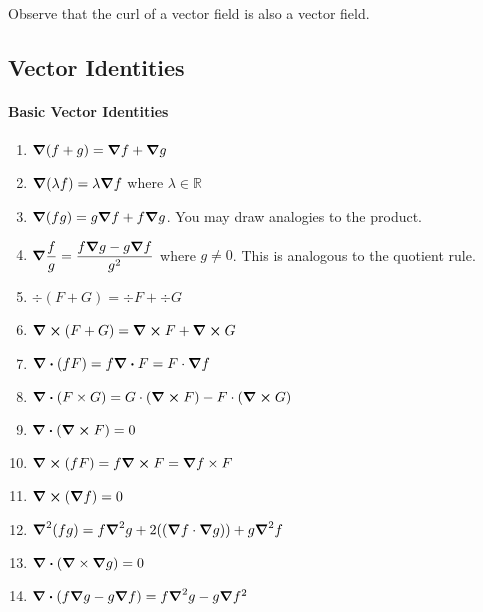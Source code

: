 Observe that the curl of a vector field is also a vector field.

\subsection{Vector Identities}


\paragraph{Basic Vector Identities}

\begin{enumerate}
    \item \(\grad(f + g) = \grad f + \grad g\)
    \item \(\grad (\lambda f) = \lambda \grad f\) where \(\lambda \in \mathbb{R}\)
    \item \(\grad (fg) = g \grad f + f \grad g\). You may draw analogies to the product.
    \item \(\grad \dfrac{f}{g} = \dfrac{f\grad g - g\grad f}{g^2}\) where \(g\neq 0\). This is analogous to the quotient rule.
    \item \(\div (F + G) = \div F + \div G\)
    \item \(\curl (F + G) = \curl F + \curl G\)
    \item \(\div (fF) = f\div F = F\cdot \grad f\)
    \item \(\div (F\times G) = G \cdot (\curl F) - F \cdot (\curl G)\)
    \item \(\div(\curl F) = 0\)
    \item \(\curl (fF) = f\curl F = \grad f \times F\)
    \item  \(\curl (\grad f) = 0\)
    \item \(\grad^2 (fg) = f\grad^2 g + 2((\grad f \cdot \grad g)) + g\grad^2f\)
    \item \(\div (\grad \times \grad g) = 0\)
    \item \(\div(f\grad g - g\grad f) = f\grad^2 g - g\grad f^2\)
\end{enumerate}
